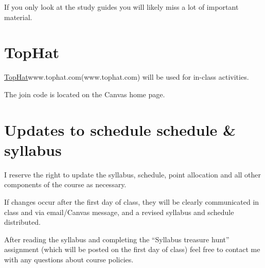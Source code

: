 \documentclass[
]{book}
\begin{document}
If you only look at the study guides you will likely miss a lot of important material.

\hypertarget{tophat}{%
\chapter{TopHat}\label{tophat}}

\protect\hyperlink{tophat}{TopHat}www.tophat.com(www.tophat.com) will be used for in-class activities.

The join code is located on the Canvas home page.

\hypertarget{updates-to-schedule-schedule-syllabus}{%
\chapter{Updates to schedule schedule \& syllabus}\label{updates-to-schedule-schedule-syllabus}}

I reserve the right to update the syllabus, schedule, point allocation and all other components of the course as necessary.

If changes occur after the first day of class, they will be clearly communicated in class and via email/Canvas message, and a revised syllabus and schedule distributed.

After reading the syllabus and completing the ``Syllabus treasure hunt'' assignment (which will be posted on the first day of class) feel free to contact me with any questions about course policies.

  
\end{document}
